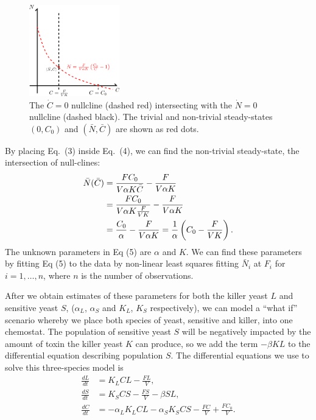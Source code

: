 \begin{multicols}{2}
\begin{figure}[H]
  \centering
    \includegraphics[width=0.35\textwidth]{images/drawing.png}
  \caption{\footnotesize The $\dot{C} = 0$ nullcline (dashed red) intersecting with the $\dot{N} = 0$ nullcline (dashed black).  The trivial and non-trivial steady-states $(0, C_0)$ and $(\bar{N}, \bar{C})$ are shown as red dots.}
\end{figure}
\vfill
\columnbreak
By placing Eq.\ (3) inside Eq.\ (4), we can find the non-trivial steady-state, the intersection of null-clines:
\begin{align}
  \bar{N}(\bar{C}) &= \frac{FC_0}{V \alpha K \bar{C}} - \frac{F}{V \alpha K}  \notag \\
  &= \frac{FC_0}{V \alpha K \frac{F}{VK}} - \frac{F}{V \alpha K} \notag \\
  &= \frac{C_0}{\alpha} - \frac{F}{V \alpha K} = \frac{1}{\alpha} \left( C_0 - \frac{F}{VK} \right).
\end{align}
The unknown parameters in Eq (5) are $\alpha$ and $K$.  We can find these parameters by fitting Eq (5) to the data by non-linear least squares fitting $\bar{N}_i$ at $F_i$ for $i = 1,\ldots,n$, where $n$ is the number of observations.
\end{multicols}

After we obtain estimates of these parameters for both the killer yeast $L$ and sensitive yeast $S$, ($\alpha_L$, $\alpha_S$ and $K_L$, $K_S$ respectively), we can model a ``what if'' scenario whereby we place both species of yeast, sensitive and killer, into one chemostat.  The population of sensitive yeast $S$ will be negatively impacted by the amount of toxin the killer yeast $K$ can produce, so we add the term $-\beta K L$ to the differential equation describing population $S$.  The differential equations we use to solve this three-species model is
\begin{align}
  \frac{dL}{dt} &= K_L CL - \frac{FL}{V}, \\
  \frac{dS}{dt} &= K_S CS - \frac{FS}{V} - \beta S L, \\
  \frac{dC}{dt} &= -\alpha_L K_L CL -\alpha_S K_S CS - \frac{FC}{V} + \frac{FC_0}{V}.
\end{align}


